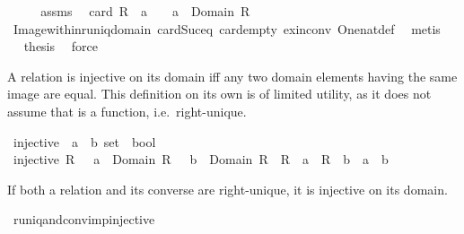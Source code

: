 \begin{isabellebody}
%
\isadelimproof
%
\endisadelimproof
%
\isatagproof
{}\isamarkupfalse%
\ {\isacharminus}\isanewline
\ \ \isamarkupfalse%
\ assms\ \isamarkupfalse%
\ {\isachardoublequoteopen}card\ {\isacharparenleft}R\ {\isacharbackquote}{\isacharbackquote}\ {\isacharbraceleft}a{\isacharbraceright}{\isacharparenright}\ {\isacharequal}\ {}\ {\isasymlongleftrightarrow}\ a\ {\isasymin}\ Domain\ R{\isachardoublequoteclose}\isanewline
\ \ \ \ \isanewline
\ \ \ \ \isamarkupfalse%
\ Image{\isacharunderscore}within{\isacharunderscore}runiq{\isacharunderscore}domain\ card{\isacharunderscore}Suc{\isacharunderscore}eq\ card{\isacharunderscore}empty\ ex{\isacharunderscore}in{\isacharunderscore}conv\ One{\isacharunderscore}nat{\isacharunderscore}def\ \isamarkupfalse%
\ metis\isanewline
\ \ \isamarkupfalse%
\ \isamarkupfalse%
\ {\isacharquery}thesis\ \isamarkupfalse%
\ force\isanewline
{}\isamarkupfalse%
%
\endisatagproof
{\isafoldproof}%
%
\isadelimproof
%
\endisadelimproof
%
\isamarkuptrue%
%
\begin{isamarkuptext}%
A relation  is injective on its domain iff any two domain elements having the same image
  are equal.  This definition on its own is of limited utility, as it does not assume that 
  is a function, i.e.\ right-unique.%
\end{isamarkuptext}%
\isamarkuptrue%
\isamarkupfalse%
\ injective\ {\isacharcolon}{\isacharcolon}\ {\isachardoublequoteopen}{\isacharparenleft}{\isacharprime}a\ {\isasymtimes}\ {\isacharprime}b{\isacharparenright}\ set\ {\isasymRightarrow}\ bool{\isachardoublequoteclose}\isanewline
{}\ {\isachardoublequoteopen}injective\ R\ {\isasymlongleftrightarrow}\ {\isacharparenleft}{\isasymforall}\ a\ {\isasymin}\ Domain\ R\ {\isachardot}\ {\isasymforall}\ b\ {\isasymin}\ Domain\ R\ {\isachardot}\ R\ {\isacharbackquote}{\isacharbackquote}\ {\isacharbraceleft}a{\isacharbraceright}\ {\isacharequal}\ R\ {\isacharbackquote}{\isacharbackquote}\ {\isacharbraceleft}b{\isacharbraceright}\ {\isasymlongrightarrow}\ a\ {\isacharequal}\ b{\isacharparenright}{\isachardoublequoteclose}%
\begin{isamarkuptext}%
If both a relation and its converse are right-unique, it is injective on its domain.%
\end{isamarkuptext}%
\isamarkuptrue%
\isamarkupfalse%
\ runiq{\isacharunderscore}and{\isacharunderscore}conv{\isacharunderscore}imp{\isacharunderscore}injective{\isacharcolon}\ \isanewline

\end{isabellebody}
